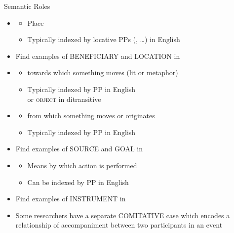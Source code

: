 \begin{frame}[allowframebreaks]{Semantic Roles}
\begin{itemize}
\item  {}
  \begin{itemize}
  \item  Place
  \item Typically indexed by locative PPs (, \ldots) in English
  \end{itemize}
  \begin{exe}
  \ex{}
  \ex{}
\end{exe}
\item Find  examples of BENEFICIARY and LOCATION in \Story{}\task
\framebreak  

\item  {}
  \begin{itemize}
  \item  towards which something moves (lit or metaphor)
 \item  Typically indexed by  PP in English 
   \\ or \textsc{object} in ditransitive
  \end{itemize}
  \begin{exe}
  \ex{}
  \ex{}
  \end{exe}
\item  {}
 \begin{itemize}
 \item  from which something moves or originates
 \item  Typically indexed by  PP in English
 \end{itemize}
  \begin{exe}
 \ex{}  
\end{exe}
\item Find  examples of SOURCE and GOAL in \Story{}\task
\framebreak 
\item  {}
  \begin{itemize}
  \item  Means by which action is performed
  \item  Can be indexed by  PP in English
  \end{itemize}
  \begin{exe}
    \ex{}
  \end{exe}
\item Find examples of INSTRUMENT in \Story{}\task
\item Some researchers have a separate COMITATIVE case which encodes a
  relationship of accompaniment between two participants in an event 
\end{itemize}


\end{frame}

